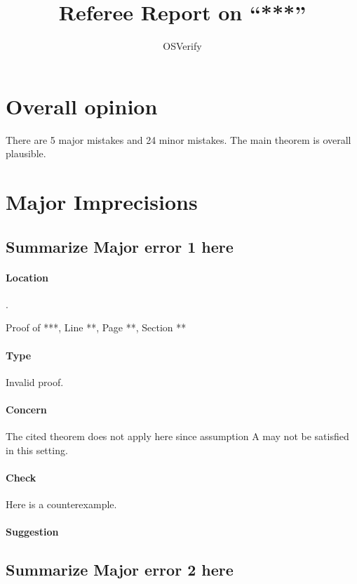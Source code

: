 \documentclass[11pt,reqno]{amsart}
\title{Referee Report on ``***''}
\author{OSVerify}
\date{}
\begin{document}
\maketitle


\section*{Overall opinion}

There are 5 major mistakes and 24 minor mistakes. The main theorem is overall plausible.

\section{Major Imprecisions}
\subsection{Summarize Major error 1 here}

\paragraph{Location}.

Proof of ***, Line **, Page **, Section **

\paragraph{Type}

Invalid proof.

\paragraph{Concern}

The cited theorem does not apply here since assumption A may not be satisfied in this setting.

\paragraph{Check}

Here is a counterexample.

\paragraph{Suggestion}



\subsection{Summarize Major error 2 here}
\end{document}
